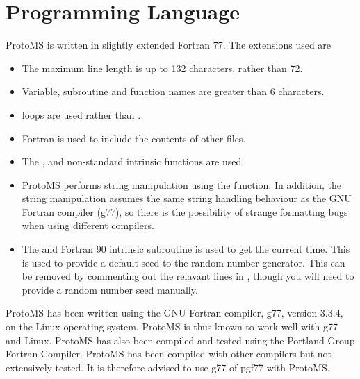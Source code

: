 \documentclass[letterpaper,10pt,english]{sphinxmanual}
\begin{document}
\section{Programming Language}
\label{compilation:programming-language}
ProtoMS is written in slightly extended Fortran 77. The extensions used are
\begin{itemize}
\item {} 
The maximum line length is up to 132 characters, rather than 72.

\item {} 
Variable, subroutine and function names are greater than 6 characters.

\item {} 
 loops are used rather than .

\item {} 
Fortran  is used to include the contents of other files.

\item {} 
The ,  and  non-standard intrinsic functions are used.

\item {} 
ProtoMS performs string manipulation using the  function. In addition, the string manipulation assumes the same string handling behaviour as the GNU Fortran compiler (g77), so there is the possibility of strange formatting bugs when using different compilers.

\item {} 
The  and  Fortran 90 intrinsic subroutine is used to get the current time. This is used to provide a default seed to the random number generator. This can be removed by commenting out the relavant lines in , though you will need to provide a random number seed manually.

\end{itemize}

ProtoMS has been written using the GNU Fortran compiler, g77, version 3.3.4, on the Linux operating system. ProtoMS is thus known to work well with g77 and Linux. ProtoMS has also been compiled and tested using the Portland Group Fortran Compiler. ProtoMS has been compiled with other compilers but not extensively tested. It is therefore advised to use g77 of pgf77 with ProtoMS.
\end{document}
